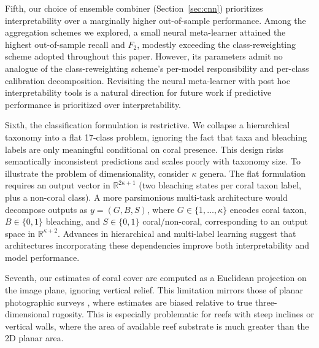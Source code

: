 \documentclass[11pt]{elsarticle}
\begin{document}
Fifth, our choice of ensemble combiner (Section~\ref{sec:cnn}) prioritizes interpretability over a marginally higher out-of-sample performance. Among the aggregation schemes we explored, a small neural meta-learner attained the highest out-of-sample recall and $F_2$, modestly exceeding the class-reweighting scheme adopted throughout this paper. However, its parameters admit no analogue of the class-reweighting scheme's per-model responsibility and per-class calibration decomposition. Revisiting the neural meta-learner with post hoc interpretability tools is a natural direction for future work if predictive performance is prioritized over interpretability.

Sixth, the classification formulation is restrictive. We collapse a hierarchical taxonomy into a flat 17-class problem, ignoring the fact that taxa and bleaching labels are only meaningful conditional on coral presence. This design risks semantically inconsistent predictions and scales poorly with taxonomy size. To illustrate the problem of dimensionality, consider $\kappa$ genera. The flat formulation requires an output vector in $\mathbb{R}^{2\kappa+1}$ (two bleaching states per coral taxon label, plus a non-coral class). A more parsimonious multi-task architecture would decompose outputs as $y = (G,B,S)$, where $G \in \{1,\ldots,\kappa\}$ encodes coral taxon, $B \in \{0,1\}$ bleaching, and $S \in \{0,1\}$ coral/non-coral, corresponding to an output space in $\mathbb{R}^{\kappa+2}$.
Advances in hierarchical and multi-label learning \citep{wehrmann2018hierarchical, deng2014large, wang2016cnn, nam2014large} suggest that architectures incorporating these dependencies improve both interpretability and model performance.

Seventh, our estimates of coral cover are computed as a Euclidean projection on the image plane, ignoring vertical relief. This limitation mirrors those of planar photographic surveys \citep{peerj954}, where estimates are biased relative to true three-dimensional rugosity. This is especially problematic for reefs with steep inclines or vertical walls, where the area of available reef substrate is much greater than the 2D planar area.
\end{document}
